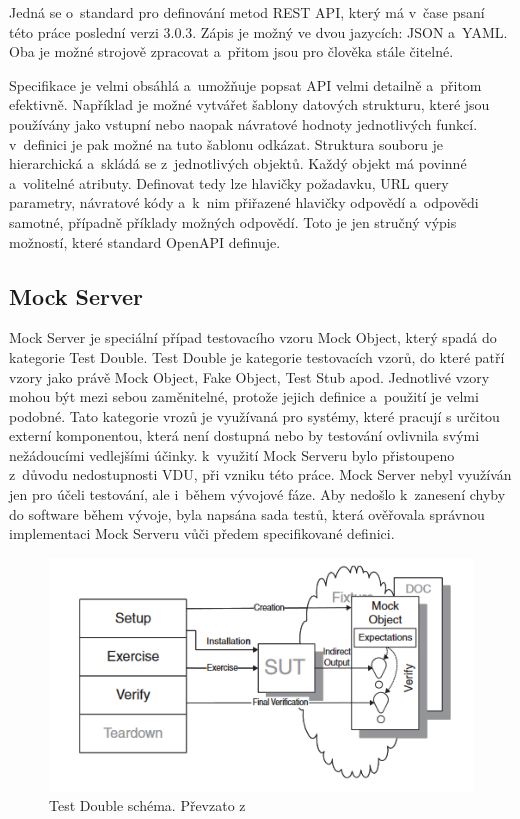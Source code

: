 Jedná se o standard pro definování metod REST API, který má v čase psaní této práce poslední verzi 3.0.3. Zápis je možný ve dvou jazycích: JSON a YAML. Oba 
je možné strojově zpracovat a přitom jsou pro člověka stále čitelné. 

Specifikace je velmi obsáhlá a umožňuje popsat API velmi detailně a přitom efektivně. Například je možné vytvářet šablony datových strukturu, které jsou používány jako
vstupní nebo naopak návratové hodnoty jednotlivých funkcí. v definici je pak možné na tuto šablonu odkázat. Struktura souboru je hierarchická a skládá se z jednotlivých objektů.
Každý objekt má povinné a volitelné atributy. Definovat tedy lze hlavičky požadavku, URL query parametry, návratové kódy a k nim přiřazené hlavičky odpovědí a odpovědi samotné,
případně příklady možných odpovědí. Toto je jen stručný výpis možností, které standard OpenAPI definuje. \cite{OpenAPI}

\subsection{Mock Server}

Mock Server je speciální případ testovacího vzoru Mock Object, který spadá do kategorie Test Double. Test Double je kategorie testovacích vzorů, do které patří
vzory jako právě Mock Object, Fake Object, Test Stub apod. Jednotlivé vzory mohou být mezi sebou zaměnitelné, protože jejich definice a použití je velmi podobné. 
Tato kategorie vrozů je využívaná pro systémy, které pracují s určitou externí komponentou, která není dostupná nebo by testování ovlivnila svými nežádoucími
vedlejšími účinky.\cite[522--524]{UnitPatternsTest} k využití Mock Serveru bylo přistoupeno z důvodu nedostupnosti VDU, při vzniku této práce. Mock Server nebyl využíván 
jen pro účeli testování, ale i během vývojové fáze. Aby nedošlo k zanesení chyby do software během vývoje, byla napsána sada testů, která ověřovala správnou
implementaci Mock Serveru vůči předem specifikované definici.

\begin{figure}[h]
    \centering
    \includegraphics[width=0.67\linewidth]{other-fig/mock_object.png}
    \caption{Test Double schéma. Převzato z \cite[544]{UnitPatternsTest}}
\end{figure}

